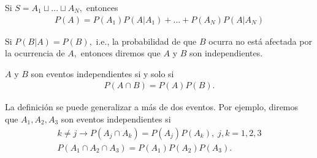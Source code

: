 {}
\begin{teorema}
	\label{thm:1.10} Si $S=A_{1}\sqcup ... \sqcup A_{N},$  entonces
	\begin{align}
		\label{1.20}
		P(A)=P(A_{1})P(A|A_{1})+...+P(A_{N})P(A|A_{N})
	\end{align}
\end{teorema}


{}
Si $P(B|A)=P(B),$ i.e., la probabilidad de que $B$ ocurra no está afectada por la ocurrencia de $A,$ entonces diremos que $A$ y $B$ son independientes.


\begin{definicion}
	$A$ y $B$ son eventos independientes si y solo si
	\begin{align}
		\label{1.21}
		P(A \cap B) = P(A)P(B).
	\end{align}
\end{definicion}


{}
La definición se puede generalizar a más de dos eventos.  Por ejemplo, diremos que $A_{1},A_{2},A_{3}$ son eventos independientes si
\begin{align}
	k\neq j \rightarrow P(A_{j} \cap A_{k})=P(A_{j})P(A_{k}), \; j,k=1,2,3 
	\\ P(A_{1}\cap A_{2} \cap A_{3})=P(A_{1})P(A_{2})P(A_{3}).
\end{align}


%	




